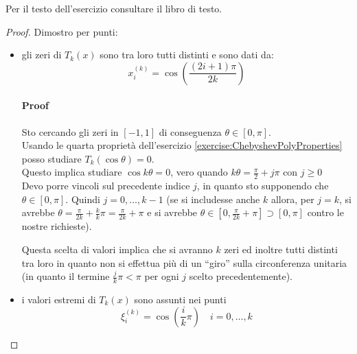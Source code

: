 \begin{exercise}[4.13]
Per il testo dell'esercizio consultare il libro di testo.
\end{exercise}
\begin{proof}
Dimostro per punti:
\begin{itemize}
  \item gli zeri di $T_{k}(x)$ sono tra loro tutti distinti e sono dati da:
  \begin{displaymath}
  x_{i}^{(k)} = \cos\left(\frac{(2i+1)\pi}{2k}\right)
  \end{displaymath}
  \paragraph{Proof} Sto cercando gli zeri in $[-1,1]$ di conseguenza 
  $\theta \in [0, \pi]$. 
  \\Usando le quarta propriet\`a dell'esercizio 
  \ref{exercise:ChebyshevPolyProperties} posso studiare $T_{k}(\cos\theta) = 0$.
  \\ Questo implica studiare $\cos k\theta = 0$, vero quando $k\theta =
  \frac{\pi}{2} + j\pi$ con $j \geq 0$
  \\ Devo porre vincoli sul precedente indice $j$, in quanto sto supponendo che
  $\theta \in [0, \pi]$. Quindi $j = 0,\ldots,k-1$ (se si includesse anche $k$
  allora, per $j = k$, si avrebbe $\theta =\frac{\pi}{2k} + \frac{k}{k}\pi =
  \frac{\pi}{2k} + \pi$ e si avrebbe $\theta \in [0, \frac{\pi}{2k} + \pi]
  \supset [0,\pi]$ contro le nostre richieste). 
  
  Questa scelta di valori implica che si
  avranno $k$ zeri ed inoltre tutti distinti tra loro in quanto non si effettua 
  pi\`u di un ``giro'' sulla circonferenza unitaria (in quanto il termine 
  $\frac{j}{k}\pi < \pi$ per ogni $j$ scelto precedentemente).
  
  \item i valori estremi di $T_{k}(x)$ sono assunti nei punti
  \begin{displaymath}
  \xi_{i}^{(k)} = \cos\left(\frac{i}{k}\pi\right) \quad i = 0,\ldots,k
  \end{displaymath} 

\end{itemize}
\end{proof}
